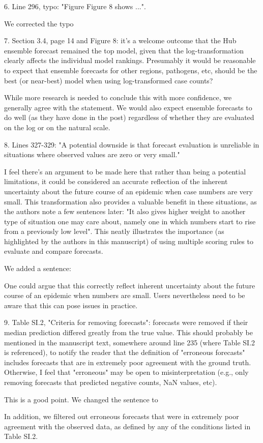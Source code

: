 \documentclass{article}
\newcommand{\black}{\color{black}}
\newcommand{\blue}{\color{blue}}
\begin{document}
\blue
6. Line 296, typo: "Figure Figure 8 shows ...".

\black
We corrected the typo

\blue
7. Section 3.4, page 14 and Figure 8: it's a welcome outcome that the Hub ensemble forecast remained the top model, given that the log-transformation clearly affects the individual model rankings. Presumably it would be reasonable to expect that ensemble forecasts for other regions, pathogens, etc, should be the best (or near-best) model when using log-transformed case counts?

\black
While more research is needed to conclude this with more confidence, we generally agree with the statement. We would also expect ensemble forecasts to do well (as they have done in the post) regardless of whether they are evaluated on the log or on the natural scale. 

\blue
8. Lines 327-329: "A potential downside is that forecast evaluation is unreliable in situations where observed values are zero or very small."

I feel there's an argument to be made here that rather than being a potential limitations, it could be considered an accurate reflection of the inherent uncertainty about the future course of an epidemic when case numbers are very small. This transformation also provides a valuable benefit in these situations, as the authors note a few sentences later: "It also gives higher weight to another type of situation one may care about, namely one in which numbers start to rise from a previously low level". This neatly illustrates the importance (as highlighted by the authors in this manuscript) of using multiple scoring rules to evaluate and compare forecasts.

\black
We added a sentence: 

One could argue that this correctly reflect inherent uncertainty about the future course of an epidemic when numbers are small. Users nevertheless need to be aware that this can pose issues in practice. 

\blue

9. Table SI.2, "Criteria for removing forecasts": forecasts were removed if their median prediction differed greatly from the true value. This should probably be mentioned in the manuscript text, somewhere around line 235 (where Table SI.2 is referenced), to notify the reader that the definition of "erroneous forecasts" includes forecasts that are in extremely poor agreement with the ground truth. Otherwise, I feel that "erroneous" may be open to misinterpretation (e.g., only removing forecasts that predicted negative counts, NaN values, etc).

\black
This is a good point. We changed the sentence to 

In addition, we filtered out erroneous forecasts that were in extremely poor agreement with the observed data, as defined by any of the conditions listed in Table SI.2. 
\end{document}
